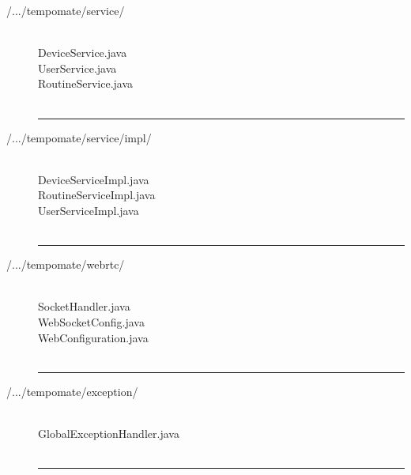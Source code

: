 \begin{enumerate}[label=\alph*]
\begin{description}
              \item[/.../tempomate/service/] \hfill \\
                    \footnotesize
                    DeviceService.java \\
                    UserService.java \\
                    RoutineService.java \\\\
                    \vspace{-0.2cm}
                    \hrule
                    \vspace{0.2cm}

              \item[/.../tempomate/service/impl/] \hfill \\
                    \footnotesize
                    DeviceServiceImpl.java \\
                    RoutineServiceImpl.java \\
                    UserServiceImpl.java \\\\
                    \vspace{-0.2cm}
                    \hrule
                    \vspace{0.2cm}

              \item[/.../tempomate/webrtc/] \hfill \\
                    \footnotesize
                    SocketHandler.java \\
                    WebSocketConfig.java \\
                    WebConfiguration.java \\\\
                    \vspace{-0.2cm}
                    \hrule
                    \vspace{0.2cm}

              \item[/.../tempomate/exception/] \hfill \\
                    \footnotesize
                    GlobalExceptionHandler.java \\\\

                    \vspace{-0.2cm}
                    \hrule
                    \vspace{0.2cm}


\end{description}
\end{enumerate}
